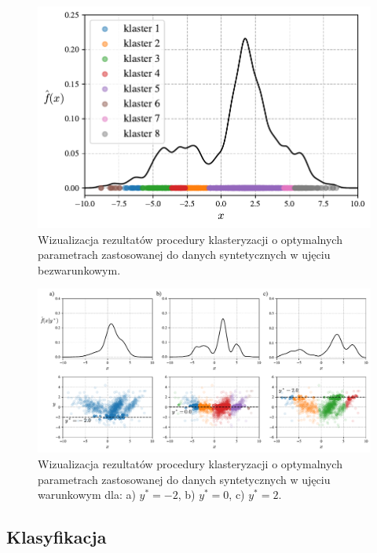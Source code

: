 \documentclass[12pt,a4paper,oneside]{book}
\theoremstyle{definition}
\begin{document}
\begin{figure}[H]
    \centering
    \includegraphics[scale=0.65]{synthetic_data_clustering_kde2}
    \vspace{-0.5cm} 
    \caption{Wizualizacja rezultatów procedury klasteryzacji o optymalnych parametrach zastosowanej do danych syntetycznych w ujęciu bezwarunkowym.}
    \label{fig:kde_synthetic_data_clustering2}
\end{figure}
\begin{figure}[H]
    \centering
    \includegraphics[scale=0.5]{synthetic_data_clustering_ckde2}
    \vspace{-0.5cm} 
    \caption{Wizualizacja rezultatów procedury klasteryzacji o optymalnych parametrach zastosowanej do danych syntetycznych w ujęciu warunkowym dla: a) $y^*=-2$, b) $y^*=0$, c) $y^*=2$.}
    \label{fig:ckde_synthetic_data_clustering2}
\end{figure}

\subsection*{Klasyfikacja}
\end{document}
